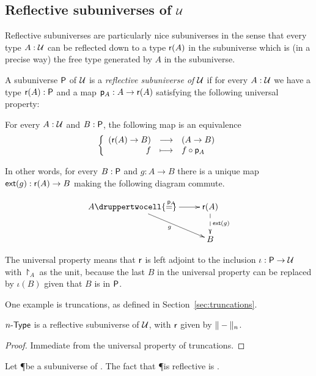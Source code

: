 \subsection{Reflective subuniverses of $\type$}

Reflective subuniverses are particularly nice subuniverses in the sense that
every type $A:\type$ can be reflected down to a type $\reflect(A)$ in the
subuniverse which is (in a precise way) the free type generated by $A$ in the
subuniverse.

\begin{defn}
  A subuniverse $\P$ of $\type$ is a \emph{reflective subuniverse of $\type$} if
  for every $A:\type$ we have a type $\reflect(A):\P$ and a map
  $\project_A:A\to\reflect(A)$ satisfying the following universal property:

  For every $A:\type$ and $B:\P$, the following map is an equivalence
  \[\function{(\reflect(A)\to{}B)}{(A\to{}B)}{f}{f\circ\project_A}\]

  In other words, for every $B:\P$ and $g:A\to{}B$ there is a unique map
  $\ext(g):\reflect(A)\to{}B$ making the following diagram commute.

  \[\uppercurveobject{{ }}\lowercurveobject{{ }}\twocellhead{{ }}
  \xymatrix{A \ar^{\project_A}[r] \ar_g[rd] \druppertwocell{=} & \reflect(A)
    \ar@{-->}^{\ext(g)}[d] \\
    & B}\]
\end{defn}

The universal property means that $\reflect$ is left adjoint to the inclusion
$\iota:\P\to\type$ with $\project_A$ as the unit, because the last $B$ in the
universal property can be replaced by $\iota(B)$ given that $B$ is in $\P$.

One example is truncations, as defined in Section~\ref{sec:truncations}.
\begin{lem}
  $\typele{n}$ is a reflective subuniverse of $\type$, with $\reflect$
  given by $\trunc{n}{-}$.
\end{lem}
\begin{proof}
Immediate from the universal property of truncations.  
\end{proof}

\begin{lem}
  Let \P be a subuniverse of \type. The fact that \P is reflective is \anhprop.
\end{lem}

